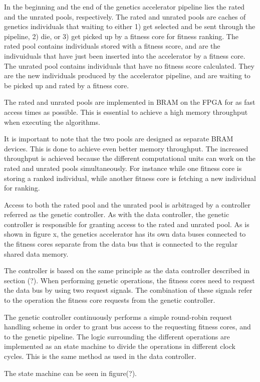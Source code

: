 In the beginning and the end of the genetics accelerator pipeline lies the rated and the unrated pools, respectively.
The rated and unrated pools are caches of genetics individuals that waiting to either 1) get selected and be sent through the pipeline, 2) die, or 3) get picked up by a fitness core for fitness ranking.
The rated pool contains individuals stored with a fitness score, and are the indivuiduals that have just been inserted into the accelerator by a fitness core.
The unrated pool contains individuals that have no fitness score calculated.
They are the new individuals produced by the accelerator pipeline, and are waiting to be picked up and rated by a fitness core.

The rated and unrated pools are implemented in \gls{BRAM} on the FPGA for as fast access times as possible.
This is essential to achieve a high memory throughput when executing the algorithms.

It is important to note that the two pools are designed as separate \gls{BRAM} devices.
This is done to achieve even better memory throughput.
The increased throughput is achieved because the different computational units can work on the rated and unrated pools simultaneously.
For instance while one fitness core is storing a ranked individual, while another fitness core is fetching a new individual for ranking. 

Access to both the rated pool and the unrated pool is arbitraged by a controller referred as the \gls{genetic controller}.
As with the \gls{data controller}, the \gls{genetic controller} is responsible for granting access to the rated and unrated pool.
As is shown in figure x\cn{}, the genetics accelerator has its own data buses connected to the fitness cores separate from the data bus that is connected to the regular shared data memory.

The controller is based on the same principle as the \gls{data controller} described in section (?)\cn.
When performing genetic operations, the fitness cores need to request the data bus by using two request signals.
The combination of these signals refer to the operation the fitness core requests from the genetic controller. 

The genetic controller continuously performs a simple round-robin request handling scheme in order to grant bus access to the requesting fitness cores, and to the genetic pipeline.
The logic surrounding the different operations are implemented as an state machine to divide the operations in different clock cycles.
This is the same method as used in the data controller.

The state machine can be seen in figure(?).\cn
